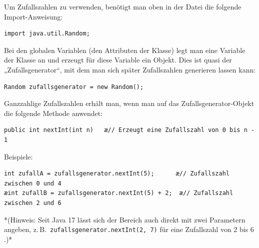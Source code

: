 \begin{compactenum}[a)]
\item Um Zufallszahlen zu verwenden, benötigt man oben in der Datei die folgende
Import-Anweisung:

\begin{lstlisting}
import java.util.Random;
\end{lstlisting}

\item Bei den globalen Variablen (den Attributen der Klasse) legt man eine
Variable der Klasse  an und erzeugt für diese Variable ein
Objekt. Dies ist quasi der „Zufallsgenerator“, mit dem man sich später
Zufallszahlen generieren lassen kann:

\begin{lstlisting}
Random zufallsgenerator = new Random();
\end{lstlisting}

\item Ganzzahlige Zufallszahlen erhält man, wenn man auf das
Zufallsgenerator-Objekt die folgende Methode anwendet:

\begin{lstlisting}
public int nextInt(int n)   æ// Erzeugt eine Zufallszahl von 0 bis n - 1
\end{lstlisting}

Beispiele:

\begin{lstlisting}
int zufallA = zufallsgenerator.nextInt(5);      æ// Zufallszahl zwischen 0 und 4
æint zufallB = zufallsgenerator.nextInt(5) + 2;  æ// Zufallszahl zwischen 2 und 6
\end{lstlisting}

*(Hinweis: Seit Java 17 lässt sich der Bereich auch direkt mit zwei Parametern
angeben, z.\,B.\ \linebreak \lstinline|zufallsgenerator.nextInt(2, 7)| für eine Zufallszahl
von $2$ bis $6$.)*
\end{compactenum}
